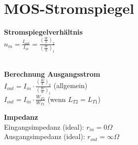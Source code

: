 \section{MOS-Stromspiegel}
\begin{minipage}{0.33\linewidth}
\textbf{Stromspiegelverhältnis}\\
$n_m = \frac{I_{out}}{I_{in}} = \frac{(\frac{W}{L})_2}{(\frac{W}{L})_1}$\\
\\
\end{minipage}%
\begin{minipage}{0.33\linewidth}
\textbf{Berechnung Ausgangsstrom} \\
$I_{out} = I_{in}\cdot \frac{(\frac{W}{L})_2}{(\frac{W}{L})_1}$ (allgemein)\vspace{5pt}\\
$I_{out} = I_{in}\cdot \frac{W_{T2}}{W_{T1}}$ (wenn $L_{T2} = L_{T1}$)
\end{minipage}%
\begin{minipage}{0.33\linewidth}
\textbf{Impedanz}\\
Eingangsimpedanz (ideal): $r_{in}=0\Omega$\\
Ausgangsimpedanz (ideal): $r_{out}=\infty\Omega$\\
\end{minipage}\\
